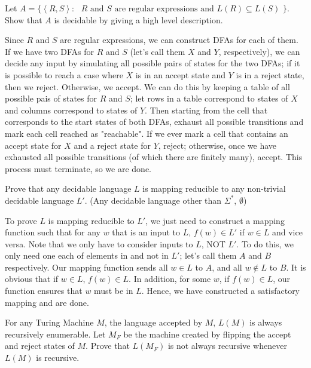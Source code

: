 \documentclass[solution, letterpaper]{cs121}
\begin{document}

Let $A=\{\left<R,S\right>: \text{ $R$ and $S$ are regular expressions
and $L(R)
\subseteq L(S)$ \}}$. Show that $A$ is decidable by giving a high level description. 

\begin{solution}
Since $R$ and $S$ are regular expressions, we can construct DFAs for each of them.  If we have two DFAs for $R$ and $S$ (let's call them $X$ and $Y$, respectively), we can decide any input by simulating all possible pairs of states for the two DFAs; if it is possible to reach a case where $X$ is in an accept state and $Y$ is in a reject state, then we reject.  Otherwise, we accept.  We can do this by keeping a table of all possible pais of states for $R$ and $S$; let rows in a table correspond to states of $X$ and columns correspond to states of $Y$.  Then starting from the cell that corresponds to the start states of both DFAs, exhaust all possible transitions and mark each cell reached as "reachable".  If we ever mark a cell that contains an accept state for $X$ and a reject state for $Y$, reject; otherwise, once we have exhausted all possible transitions (of which there are finitely many), accept.  This process must terminate, so we are done.
\end{solution}




Prove that any decidable language $L$ is mapping reducible to any non-trivial decidable language $L'$. (Any decidable language other than $\Sigma^*$, $\emptyset$)

\begin{solution}
To prove $L$ is mapping reducible to $L'$, we just need to construct a mapping function such that for any $w$ that is an input to $L$, $f(w) \in L'$ if $w \in L$ and vice versa.  Note that we only have to consider inputs to $L$, NOT $L'$.  To do this, we only need one each of elements in and not in $L'$; let's call them $A$ and $B$ respectively.  Our mapping function sends all $w \in L$ to $A$, and all $w \notin L$ to $B$.  It is obvious that if $w \in L$, $f(w) \in L$.  In addition, for some $w$, if $f(w) \in L$, our function ensures that $w$ must be in $L$.  Hence, we have constructed a satisfactory mapping and are done.
\end{solution}



For any Turing Machine $M$, the language accepted by $M$, $L(M)$ is always
recursively enumerable. Let $M_F$ be the machine created by flipping the accept
and reject states of $M$. Prove that $L(M_F)$ is not always recursive whenever $L(M)$ is recursive.
\end{document}
